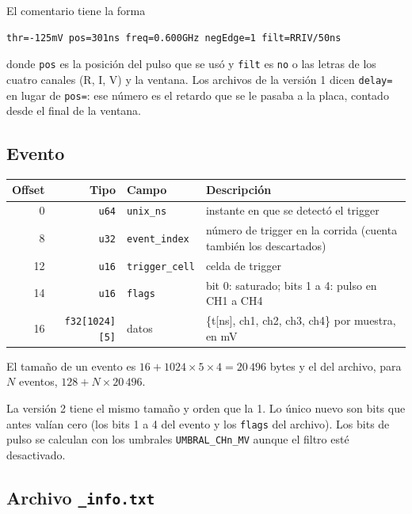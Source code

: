 \documentclass[11pt,a4paper]{article}
\newcommand{\code}[1]{\texttt{#1}}
\begin{document}
El comentario tiene la forma

\begin{lstlisting}[style=shell]
thr=-125mV pos=301ns freq=0.600GHz negEdge=1 filt=RRIV/50ns
\end{lstlisting}

donde \code{pos} es la posición del pulso que se usó y \code{filt} es \code{no} o
las letras de los cuatro canales (R, I, V) y la ventana. Los archivos de la versión
1 dicen \code{delay=} en lugar de \code{pos=}: ese número es el retardo que se le
pasaba a la placa, contado desde el final de la ventana.

\subsection{Evento}

\begin{center}
\small
\begin{tabular}{rrl>{\raggedright\arraybackslash}p{7.4cm}}
\toprule
Offset & Tipo & Campo & Descripción \\
\midrule
0 & \code{u64} & \code{unix\_ns} & instante en que se detectó el trigger \\
8 & \code{u32} & \code{event\_index} & número de trigger en la corrida (cuenta también los descartados) \\
12 & \code{u16} & \code{trigger\_cell} & celda de trigger \\
14 & \code{u16} & \code{flags} & bit 0: saturado; bits 1 a 4: pulso en CH1 a CH4 \\
16 & \code{f32[1024][5]} & datos & \{t[ns], ch1, ch2, ch3, ch4\} por muestra, en mV \\
\bottomrule
\end{tabular}
\end{center}

El tamaño de un evento es $16 + 1024 \times 5 \times 4 = 20\,496$ bytes y el del
archivo, para $N$ eventos, $128 + N \times 20\,496$.

\begin{nota}
La versión 2 tiene el mismo tamaño y orden que la 1. Lo único nuevo son bits que
antes valían cero (los bits 1 a 4 del evento y los \code{flags} del archivo). Los
bits de pulso se calculan con los umbrales \code{UMBRAL\_CHn\_MV} aunque el filtro
esté desactivado.
\end{nota}

\subsection{Archivo \code{\_info.txt}}
\end{document}
